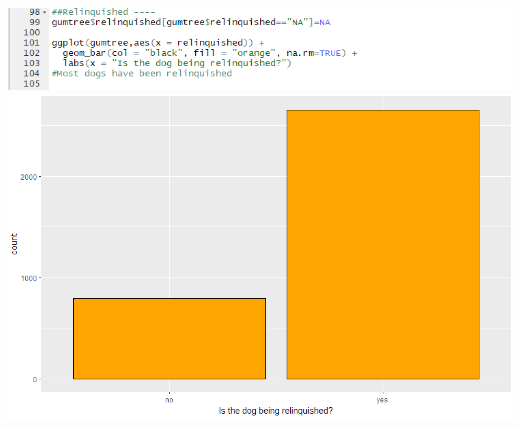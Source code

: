 \documentclass[a4paper]{article}
\begin{document}
{\includegraphics[scale=.75]{gumtree_RelinCode.PNG}\\
\includegraphics[scale=.75]{gumtree_RelinGraph.PNG}\\}


	
	
\end{document}
